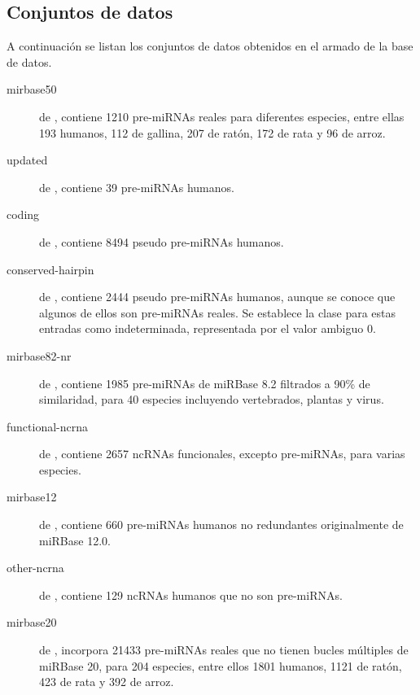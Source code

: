 \documentclass[12pt,bibliography=oldstyle,DIV=12,parskip=half-,titlepage]{scrartcl}
\begin{document}
\subsection{Conjuntos de datos}
A continuación se listan los conjuntos de datos obtenidos en el armado
de la base de datos.
\begin{description}
\item[mirbase50] de \cite{xue}, contiene 1210 pre-miRNAs reales para
  diferentes especies, entre ellas 193 humanos, 112 de gallina, 207 de
  ratón, 172 de rata y 96 de arroz.
\item[updated] de \cite{xue}, contiene 39 pre-miRNAs humanos.
\item[coding] de \cite{xue}, contiene 8494 pseudo pre-miRNAs humanos.
\item[conserved-hairpin] de \cite{xue}, contiene 2444 pseudo
  pre-miRNAs humanos, aunque se conoce que algunos de ellos son
  pre-miRNAs reales. Se establece la clase para estas entradas como
  indeterminada, representada por el valor ambiguo 0.
\item[mirbase82-nr] de \cite{ng}, contiene 1985 pre-miRNAs de miRBase
  8.2 filtrados a 90\% de similaridad, para 40 especies incluyendo
  vertebrados, plantas y virus.
\item[functional-ncrna] de \cite{ng}, contiene 2657 ncRNAs
  funcionales, excepto pre-miRNAs, para varias
  especies.\item[mirbase12] de \cite{batuwita}, contiene 660
  pre-miRNAs humanos no redundantes originalmente de miRBase 12.0.
\item[other-ncrna] de \cite{batuwita}, contiene 129 ncRNAs humanos que
  no son pre-miRNAs.
\item[mirbase20] de \cite{mirbase}, incorpora 21433 pre-miRNAs reales
  que no tienen bucles múltiples de miRBase 20, para 204 especies,
  entre ellos 1801 humanos, 1121 de ratón, 423 de rata y 392 de arroz.
\end{description}
%
%
\renewcommand{\bibfont}{\normalfont\footnotesize}
\printbibliography
%
\end{document}
